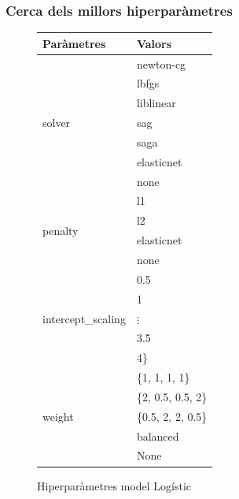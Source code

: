 \documentclass[a4paper, 11pt]{article}
\begin{document}
\subsubsection{Cerca dels millors hiperparàmetres} \label{hiper_para_log}
\begin{figure}[h] %
\begin{minipage}{8cm} %
\begin{center} %
    \begin{tabular}{l|l}
        \textbf{Paràmetres} & \textbf{Valors} \\\hline\hline
        \multirow{7}{*}{solver} & newton-cg\\
        &\cellcolor{lightapricot}lbfgs\\
        &liblinear\\
        &sag\\
        &saga\\
        &elasticnet\\
        &none\\ \hline
        \multirow{4}{*}{penalty} & l1\\
        & \cellcolor{lightapricot}l2\\
        & elasticnet\\
        & none \\ \hline
        \multirow{5}{*}{intercept\_scaling} & \cellcolor{lightapricot}0.5\\
        & 1\\
        &$\vdots$\\
        & 3.5\\
        & 4\}\\ \hline
        \multirow{5}{*}{weight} & \{1, 1, 1, 1\}\\
        & \{2, 0.5, 0.5, 2\}\\
        & \{0.5, 2, 2, 0.5\}\\
        & \cellcolor{lightapricot}balanced \\
        & None \\
    \end{tabular}
    \caption{Hiperparàmetres model Logístic}
    \label{tab:afins}
\end{center}
\end{minipage} %
\hspace{2em}
\begin{minipage}{6.5cm} %

\end{minipage}
\end{figure}
\end{document}
